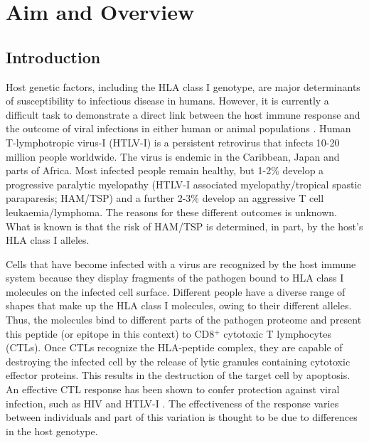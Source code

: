 
\chapter{Aim and Overview} %
\label{Chapter1}

\section{Introduction}

Host genetic factors, including the HLA class I genotype, are major determinants of susceptibility to infectious disease in humans. However, it is currently a difficult task to demonstrate a direct link between the host immune response and the outcome of viral infections in either human or animal populations \citep{Jeffery1999}. Human T-lymphotropic virus-I (HTLV-I) is a persistent retrovirus that infects 10-20 million people worldwide. The virus is endemic in the Caribbean, Japan and parts of Africa. Most infected people remain healthy, but 1-2\% develop a progressive paralytic myelopathy (HTLV-I associated myelopathy/tropical spastic paraparesis; HAM/TSP) and a further 2-3\% develop an aggressive T cell leukaemia/lymphoma. The reasons for these different outcomes is unknown. What is known is that the risk of HAM/TSP is determined, in part, by the host's HLA class I alleles. 

Cells that have become infected with a virus are recognized by the host immune system because they display fragments of the pathogen bound to HLA class I molecules on the infected cell surface. Different people have a diverse range of shapes that make up the HLA class I molecules, owing to their different alleles. Thus, the molecules bind to different parts of the pathogen proteome and present this peptide (or epitope in this context) to CD8$^+$ cytotoxic T lymphocytes (CTLs). Once CTLs recognize the HLA-peptide complex, they are capable of destroying the infected cell by the release of lytic granules containing cytotoxic effector proteins. This results in the destruction of the target cell by apoptosis. An effective CTL response has been shown to confer protection against viral infection, such as HIV \citep{Ngandu2007} and HTLV-I \citep{Bangham2005}. The effectiveness of the response varies between individuals and part of this variation is thought to be due to differences in the host genotype.

